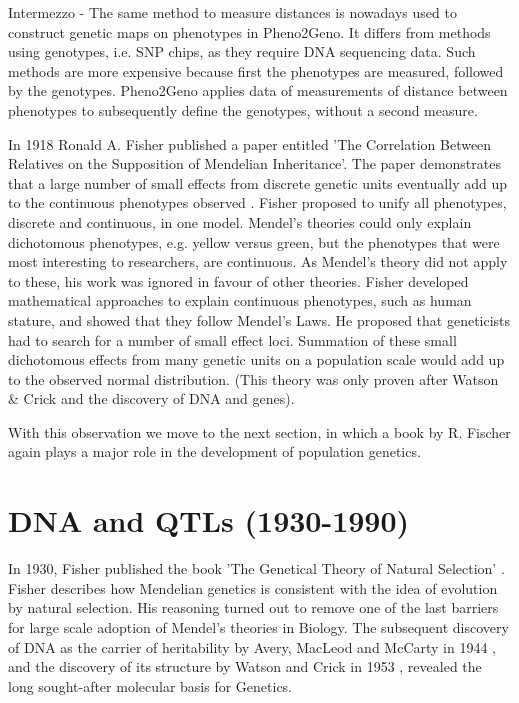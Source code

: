 Intermezzo - The same method to measure distances is nowadays used to construct genetic maps on phenotypes in Pheno2Geno. 
It differs from methods using genotypes, i.e. SNP chips, as they require DNA sequencing data. Such methods are more 
expensive because first the phenotypes are measured, followed by the genotypes. Pheno2Geno applies data of measurements 
of distance between phenotypes to subsequently define the genotypes, without a second measure.  

In 1918 Ronald A. Fisher published a paper entitled 'The Correlation Between Relatives on the Supposition of 
Mendelian Inheritance'. The paper demonstrates that a large number of small effects from discrete genetic 
units eventually add up to the continuous phenotypes observed \cite{Fisher:1918}. Fisher proposed to unify all 
phenotypes, discrete and continuous, in one model. Mendel's theories could only explain dichotomous phenotypes, 
e.g. yellow versus green, but the phenotypes that were most interesting to researchers, are continuous. As 
Mendel's theory did not apply to these, his work was ignored in favour of other theories. Fisher developed 
mathematical approaches to explain continuous phenotypes, such as human stature, and showed that they follow 
Mendel's Laws. He proposed that geneticists had to search for a number of small effect loci. Summation of 
these small dichotomous effects from many genetic units on a population scale would add up to the observed 
normal distribution. (This theory was only proven after Watson \& Crick and the discovery of DNA and genes).

With this observation we move to the next section, in which a book by R. Fischer again plays a major role in 
the development of population genetics.

\section{DNA and QTLs (1930-1990)}

In 1930, Fisher published the book 'The Genetical Theory of Natural Selection' \cite{Fisher:1930}. Fisher describes 
how Mendelian genetics is consistent with the idea of evolution by natural selection. His reasoning turned out 
to remove one of the last barriers for large scale adoption of Mendel's theories in Biology. The subsequent discovery 
of DNA as the carrier of heritability by Avery, MacLeod and McCarty in 1944 \cite{Avery:1944}, and the discovery of 
its structure by Watson and Crick in 1953 \cite{Watson:1953}, revealed the long sought-after molecular basis for Genetics. 

